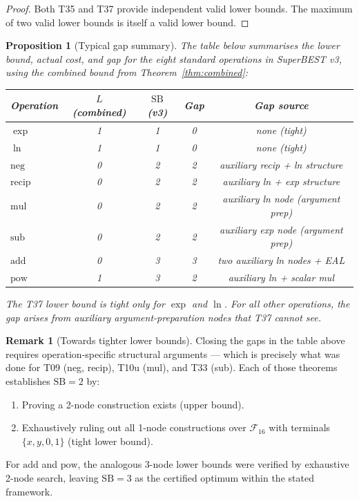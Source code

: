 \documentclass[12pt,a4paper]{article}
\newtheorem{proposition}[theorem]{Proposition}
\theoremstyle{definition}
\newtheorem{remark}[theorem]{Remark}
\newcommand{\SB}{\mathrm{SB}}
\newcommand{\Fam}{\mathcal{F}}
\begin{document}
\begin{proof}
Both T35 and T37 provide independent valid lower bounds.  The maximum of two
valid lower bounds is itself a valid lower bound.
\end{proof}

\begin{proposition}[Typical gap summary]\label{prop:gapsummary}
The table below summarises the lower bound, actual cost, and gap for the eight
standard operations in SuperBEST v3, using the combined bound from
Theorem~\ref{thm:combined}:

\begin{center}
\begin{tabular}{@{}lcccc@{}}
\toprule
\textbf{Operation} & \textbf{$L$ (combined)} & \textbf{$\SB$ (v3)} & \textbf{Gap} & \textbf{Gap source} \\
\midrule
$\exp$          & 1 & 1 & 0 & none (tight) \\
$\ln$           & 1 & 1 & 0 & none (tight) \\
$\mathrm{neg}$  & 0 & 2 & 2 & auxiliary recip + ln structure \\
$\mathrm{recip}$& 0 & 2 & 2 & auxiliary ln + exp structure \\
$\mathrm{mul}$  & 0 & 2 & 2 & auxiliary ln node (argument prep) \\
$\mathrm{sub}$  & 0 & 2 & 2 & auxiliary exp node (argument prep) \\
$\mathrm{add}$  & 0 & 3 & 3 & two auxiliary ln nodes + EAL \\
$\mathrm{pow}$  & 1 & 3 & 2 & auxiliary ln + scalar mul \\
\bottomrule
\end{tabular}
\end{center}

The T37 lower bound is tight only for $\exp$ and $\ln$.  For all other
operations, the gap arises from auxiliary argument-preparation nodes that T37
cannot see.
\end{proposition}

\begin{remark}[Towards tighter lower bounds]\label{rem:tighter}
Closing the gaps in the table above requires operation-specific structural
arguments --- which is precisely what was done for T09 (neg, recip), T10u
(mul), and T33 (sub).  Each of those theorems establishes $\SB = 2$ by:
\begin{enumerate}
  \item Proving a 2-node construction exists (upper bound).
  \item Exhaustively ruling out all 1-node constructions over $\Fam_{16}$
        with terminals $\{x, y, 0, 1\}$ (tight lower bound).
\end{enumerate}
For $\mathrm{add}$ and $\mathrm{pow}$, the analogous 3-node lower bounds were
verified by exhaustive 2-node search, leaving $\SB = 3$ as the certified
optimum within the stated framework.
\end{remark}
\end{document}

